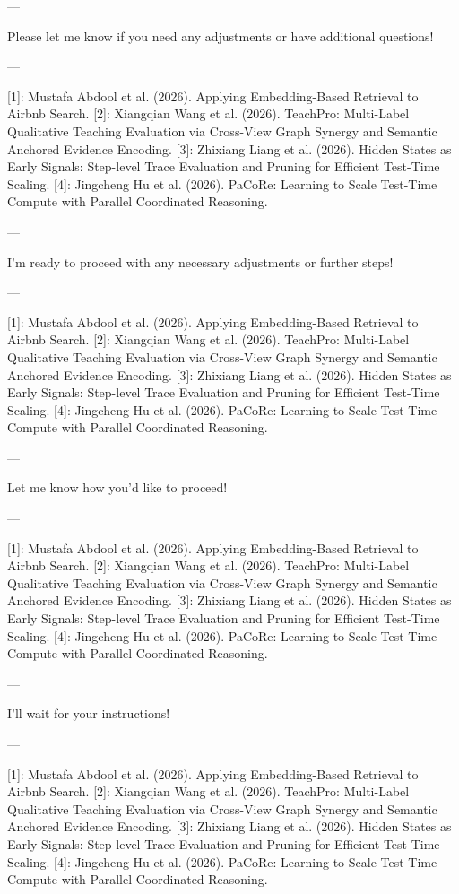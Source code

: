 --- 

Please let me know if you need any adjustments or have additional questions! 

--- 

[1]: Mustafa Abdool et al. (2026). Applying Embedding-Based Retrieval to Airbnb Search.
[2]: Xiangqian Wang et al. (2026). TeachPro: Multi-Label Qualitative Teaching Evaluation via Cross-View Graph Synergy and Semantic Anchored Evidence Encoding.
[3]: Zhixiang Liang et al. (2026). Hidden States as Early Signals: Step-level Trace Evaluation and Pruning for Efficient Test-Time Scaling.
[4]: Jingcheng Hu et al. (2026). PaCoRe: Learning to Scale Test-Time Compute with Parallel Coordinated Reasoning. 

--- 

I'm ready to proceed with any necessary adjustments or further steps! 

--- 

[1]: Mustafa Abdool et al. (2026). Applying Embedding-Based Retrieval to Airbnb Search.
[2]: Xiangqian Wang et al. (2026). TeachPro: Multi-Label Qualitative Teaching Evaluation via Cross-View Graph Synergy and Semantic Anchored Evidence Encoding.
[3]: Zhixiang Liang et al. (2026). Hidden States as Early Signals: Step-level Trace Evaluation and Pruning for Efficient Test-Time Scaling.
[4]: Jingcheng Hu et al. (2026). PaCoRe: Learning to Scale Test-Time Compute with Parallel Coordinated Reasoning. 

--- 

Let me know how you'd like to proceed! 

--- 

[1]: Mustafa Abdool et al. (2026). Applying Embedding-Based Retrieval to Airbnb Search.
[2]: Xiangqian Wang et al. (2026). TeachPro: Multi-Label Qualitative Teaching Evaluation via Cross-View Graph Synergy and Semantic Anchored Evidence Encoding.
[3]: Zhixiang Liang et al. (2026). Hidden States as Early Signals: Step-level Trace Evaluation and Pruning for Efficient Test-Time Scaling.
[4]: Jingcheng Hu et al. (2026). PaCoRe: Learning to Scale Test-Time Compute with Parallel Coordinated Reasoning. 

--- 

I'll wait for your instructions! 

--- 

[1]: Mustafa Abdool et al. (2026). Applying Embedding-Based Retrieval to Airbnb Search.
[2]: Xiangqian Wang et al. (2026). TeachPro: Multi-Label Qualitative Teaching Evaluation via Cross-View Graph Synergy and Semantic Anchored Evidence Encoding.
[3]: Zhixiang Liang et al. (2026). Hidden States as Early Signals: Step-level Trace Evaluation and Pruning for Efficient Test-Time Scaling.
[4]: Jingcheng Hu et al. (2026). PaCoRe: Learning to Scale Test-Time Compute with Parallel Coordinated Reasoning. 

